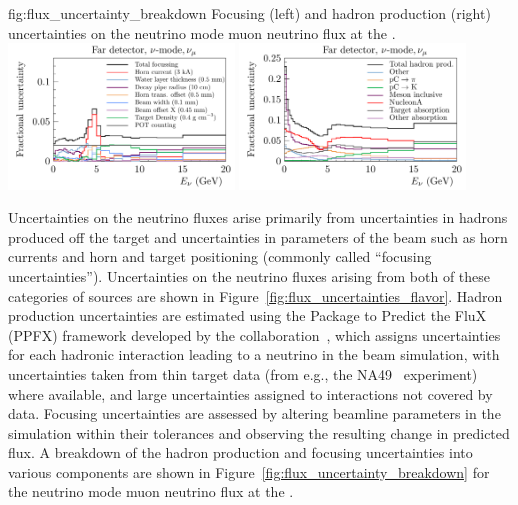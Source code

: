 \begin{dunefigure}{fig:flux_uncertainty_breakdown}
{Focusing (left) and hadron production (right) uncertainties on the neutrino mode muon neutrino flux at the .}
  \includegraphics[width=0.45\textwidth]{graphics/NonHP_FD_numu_ErrBreakdown_left.pdf}
  \includegraphics[width=0.45\textwidth]{graphics/HP_FD_numu_ErrBreakdown_right.pdf}

\end{dunefigure}

Uncertainties on the neutrino fluxes arise primarily from uncertainties in hadrons produced off the target and uncertainties in parameters of the beam such as horn currents and horn and target positioning (commonly called ``focusing uncertainties'').  Uncertainties on the neutrino fluxes arising from both of these categories of sources are shown in Figure~\ref{fig:flux_uncertainties_flavor}.  Hadron production uncertainties are estimated using the Package to Predict the FluX (PPFX) framework developed by the \minerva collaboration~\cite{Aliaga:2016oaz, AliagaSoplin:2016shs}, which assigns uncertainties for each hadronic interaction leading to a neutrino in the beam simulation, with uncertainties taken from thin target data (from e.g., the NA49~\cite{NA49} experiment) where available, and large uncertainties assigned to interactions not covered by data.  Focusing uncertainties are assessed by altering beamline parameters in the simulation within their tolerances and observing the resulting change in predicted flux.  A breakdown of the hadron production and focusing uncertainties into various components are shown in Figure~\ref{fig:flux_uncertainty_breakdown} for the neutrino mode muon neutrino flux at the .    

